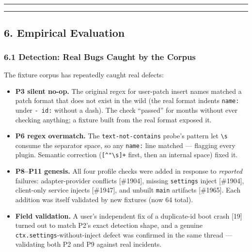 \documentclass[
]{article}
\providecommand{\tightlist}{%
  \setlength{\itemsep}{0pt}\setlength{\parskip}{0pt}}
\begin{document}
\begin{center}\rule{0.5\linewidth}{0.5pt}\end{center}

\begin{center}\rule{0.5\linewidth}{0.5pt}\end{center}

\subsection{6. Empirical Evaluation}\label{empirical-evaluation}

\subsubsection{6.1 Detection: Real Bugs Caught by the
Corpus}\label{detection-real-bugs-caught-by-the-corpus}

The fixture corpus has repeatedly caught real defects:

\begin{itemize}
\tightlist
\item
  \textbf{P3 silent no-op.} The original regex for user-patch insert
  names matched a patch format that does not exist in the wild (the real
  format indents \texttt{name:} under \texttt{-\ id:} without a dash).
  The check ``passed'' for months without ever checking anything; a
  fixture built from the real format exposed it.
\item
  \textbf{P6 regex overmatch.} The \texttt{text-not-contains} probe's
  pattern let \texttt{\textbackslash{}s} consume the separator space, so
  any \texttt{name:} line matched --- flagging every plugin. Semantic
  correction (\texttt{{[}\^{}\textquotesingle{}"\textbackslash{}s{]}+}
  first, then an internal space) fixed it.
\item
  \textbf{P8--P11 genesis.} All four profile checks were added in
  response to \emph{reported} failures: adapter-provider conflicts
  {[}\#1904{]}, missing \texttt{settings} inject {[}\#1904{]},
  client-only service injects {[}\#1947{]}, and unbuilt \texttt{main}
  artifacts {[}\#1965{]}. Each addition was itself validated by new
  fixtures (now 64 total).
\item
  \textbf{Field validation.} A user's independent fix of a duplicate-id
  boot crash {[}19{]} turned out to match P2's exact detection shape,
  and a genuine \texttt{ctx.settings}-without-inject defect was
  confirmed in the same thread --- validating both P2 and P9 against
  real incidents.
\end{itemize}
\end{document}
